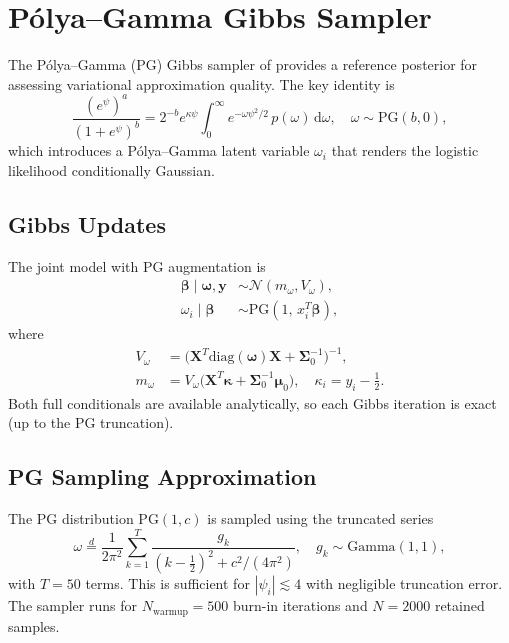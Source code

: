 \documentclass[11pt,a4paper]{article}
\newcommand{\N}{\mathcal{N}}
\begin{document}
\section{P\'{o}lya--Gamma Gibbs Sampler}

The P\'{o}lya--Gamma (PG) Gibbs sampler of \textcite{Polson2013} provides a reference
posterior for assessing variational approximation quality.
The key identity is
\begin{equation}
  \frac{(e^\psi)^a}{(1+e^\psi)^b}
  = 2^{-b} e^{\kappa\psi}
    \int_0^\infty e^{-\omega\psi^2/2}\, p(\omega)\,\mathrm{d}\omega,
  \quad \omega \sim \mathrm{PG}(b, 0),
\end{equation}
which introduces a P\'{o}lya--Gamma latent variable $\omega_i$ that renders the
logistic likelihood conditionally Gaussian.

\subsection{Gibbs Updates}

The joint model with PG augmentation is
\begin{align}
  \bm{\beta} \mid \bm{\omega}, \bm{y} &\sim \N(m_\omega, V_\omega),\\
  \omega_i \mid \bm{\beta} &\sim \mathrm{PG}(1,\, x_i^T\bm{\beta}),
\end{align}
where
\begin{align}
  V_\omega &= \bigl(\bm{X}^T \mathrm{diag}(\bm{\omega})\bm{X} + \bm{\Sigma}_0^{-1}\bigr)^{-1},\\
  m_\omega &= V_\omega\bigl(\bm{X}^T\bm{\kappa} + \bm{\Sigma}_0^{-1}\bm{\mu}_0\bigr),
  \quad \kappa_i = y_i - \tfrac{1}{2}.
\end{align}
Both full conditionals are available analytically, so each Gibbs iteration is exact
(up to the PG truncation).

\subsection{PG Sampling Approximation}

The PG distribution $\mathrm{PG}(1, c)$ is sampled using the truncated series
\begin{equation}
  \omega \stackrel{d}{=} \frac{1}{2\pi^2}
  \sum_{k=1}^{T} \frac{g_k}{(k-\tfrac{1}{2})^2 + c^2/(4\pi^2)},
  \quad g_k \sim \mathrm{Gamma}(1,1),
\end{equation}
with $T=50$ terms.
This is sufficient for $|\psi_i| \lesssim 4$ with negligible truncation error.
The sampler runs for $N_{\mathrm{warmup}} = 500$ burn-in iterations and
$N = 2000$ retained samples.
\end{document}
